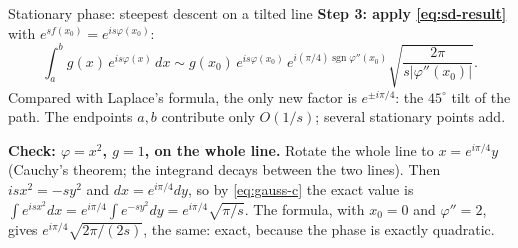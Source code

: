 \documentclass[11pt]{beamer}
\begin{document}
\begin{frame}[allowframebreaks=1.00]{Stationary phase: steepest descent on a tilted line}
\textbf{Step 3: apply \eqref{eq:sd-result}} with \(e^{sf(x_0)}=e^{is\varphi(x_0)}\):
\begin{equation}
  \int_a^b g(x)\,e^{is\varphi(x)}\,dx
  \sim
  g(x_0)\,e^{is\varphi(x_0)}\,
  e^{i(\pi/4)\operatorname{sgn}\varphi''(x_0)}
  \sqrt{\frac{2\pi}{s\bigl|\varphi''(x_0)\bigr|}} .
  \label{eq:stationary-phase}
\end{equation}
Compared with Laplace's formula, the only new factor is \(e^{\pm i\pi/4}\): the \(45^\circ\) tilt of the path. The
endpoints \(a,b\) contribute only \(O(1/s)\); several stationary points add.


\textbf{Check: \(\varphi=x^2\), \(g=1\), on the whole line.} Rotate the whole line to \(x=e^{i\pi/4}y\) (Cauchy's theorem;
the integrand decays between the two lines). Then \(isx^2=-sy^2\) and \(dx=e^{i\pi/4}dy\), so by \eqref{eq:gauss-c} the exact
value is \(\int e^{isx^2}dx=e^{i\pi/4}\int e^{-sy^2}dy=e^{i\pi/4}\sqrt{\pi/s}\). The formula, with \(x_0=0\) and \(\varphi''=2\), gives
\(e^{i\pi/4}\sqrt{2\pi/(2s)}\), the same: exact, because the phase is exactly quadratic.
\end{frame}
\end{document}
